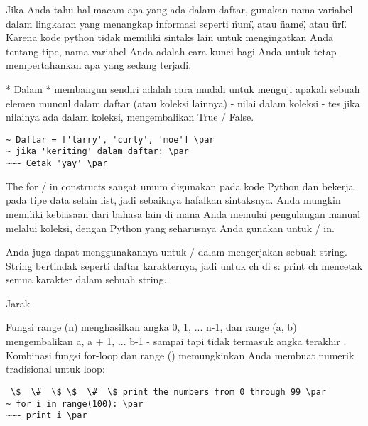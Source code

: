 \vspace{12pt}
Jika Anda tahu hal macam apa yang ada dalam daftar, gunakan nama variabel dalam lingkaran yang menangkap informasi seperti \"num\", atau \"name\", atau \"url\". Karena kode python tidak memiliki sintaks lain untuk mengingatkan Anda tentang tipe, nama variabel Anda adalah cara kunci bagi Anda untuk tetap mempertahankan apa yang sedang terjadi. \par
\vspace{12pt}
* Dalam * membangun sendiri adalah cara mudah untuk menguji apakah sebuah elemen muncul dalam daftar (atau koleksi lainnya) - nilai dalam koleksi - tes jika nilainya ada dalam koleksi, mengembalikan True / False. \par
\vspace{12pt}
\begin{verbatim}
~ Daftar = ['larry', 'curly', 'moe'] \par
~ jika 'keriting' dalam daftar: \par
~~~ Cetak 'yay' \par
\end{verbatim}
\vspace{12pt}
The for / in constructs sangat umum digunakan pada kode Python dan bekerja pada tipe data selain list, jadi sebaiknya hafalkan sintaksnya. Anda mungkin memiliki kebiasaan dari bahasa lain di mana Anda memulai pengulangan manual melalui koleksi, dengan Python yang seharusnya Anda gunakan untuk / in. \par
\vspace{12pt}
Anda juga dapat menggunakannya untuk / dalam mengerjakan sebuah string. String bertindak seperti daftar karakternya, jadi untuk ch di s: print ch mencetak semua karakter dalam sebuah string. \par
Jarak \par
\vspace{12pt}
Fungsi range (n) menghasilkan angka 0, 1, ... n-1, dan range (a, b) mengembalikan a, a + 1, ... b-1 - sampai tapi tidak termasuk angka terakhir . Kombinasi fungsi for-loop dan range () memungkinkan Anda membuat numerik tradisional untuk loop: \par
\vspace{12pt}
\vspace{12pt}
\begin{verbatim}
 \$  \#  \$ \$  \#  \$ print the numbers from 0 through 99 \par
~ for i in range(100): \par
~~~ print i \par
\end{verbatim}
